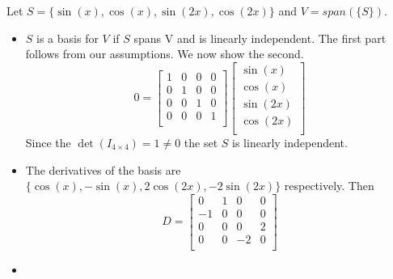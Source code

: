 \documentclass[12pt]{article}
\newenvironment{problem}[2][Problem]{\begin{trivlist}
\item[\hskip \labelsep {\bfseries #1}\hskip \labelsep {\bfseries #2}]}{\end{trivlist}}
\begin{document}
\begin{problem}{8.} Let $S = \{\sin(x), \cos(x), \sin(2x), \cos(2x) \}$ and $V = span(\{S\})$. 
\begin{itemize}
\item [(i)] $S$ is a basis for $V$ if $S$ spans V and is linearly independent. The first part follows from our assumptions. We now show the second. 
\[0 =
  \left[ {\begin{array}{cccc}
   1 & 0 & 0 & 0\\
   0 & 1 & 0 & 0\\
   0 & 0 & 1 & 0\\
   0 & 0 & 0 & 1\\
  \end{array} } \right]\begin{bmatrix}
   \sin(x) \\
   \cos(x) \\
   \sin(2x) \\
   \cos(2x)\\
  \end{bmatrix} 
\]
Since the $\det(I_{4 \times 4}) = 1 \neq 0$ the set $S$ is linearly independent. 
\item [(ii)] The derivatives of the basis are $\{\cos(x), -\sin(x), 2\cos(2x), -2\sin(2x)\}$ respectively. Then \[D=
  \left[ {\begin{array}{cccc}
   0 & 1 & 0 & 0\\
   -1 & 0 & 0 & 0\\
   0 & 0 & 0 & 2\\
   0 & 0 & -2 & 0\\
  \end{array} } \right]
\]
\item [(iii)]
\end{itemize}
\end{problem}

\begin{problem}{13.} 
\end{problem}

\begin{problem}{15.} 
\end{problem}

\begin{problem}{16.} 
\end{problem}

\begin{problem}{18.} 
\end{problem}

\begin{problem}{20.} 
\end{problem}
\end{document}
